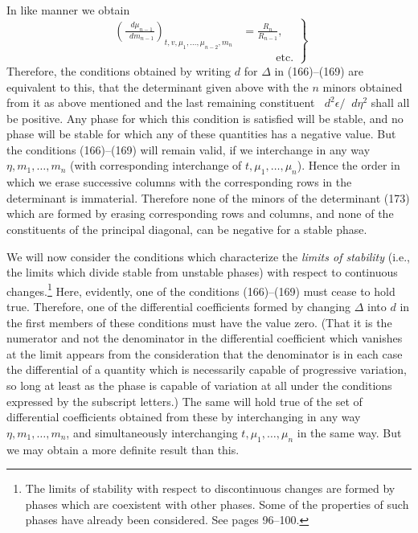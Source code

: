 \documentclass[11pt]{article}
\newcommand{\dd}{\mathop{}\!d}
\newcommand{\eps}{\epsilon}
\newcommand{\D}{\Delta}
\begin{document}
In like manner we obtain
\begin{equation}
\left.\begin{aligned}
\left(\frac{\dd\mu_{n-1}}{\dd m_{n-1}}\right)_{t,v,\mu_1,\ldots,\mu_{n-2},m_n}&=\frac{R_n}{R_{n-1}},\\
&\hspace{3em}\text{etc.}
\end{aligned}\right\}
\end{equation}
Therefore, the conditions obtained by writing $d$ for $\D$ in (166)--(169) are equivalent to this, that the determinant given above with the $n$ minors obtained from it as above mentioned and the last remaining constituent $\dd^2\eps/\dd\eta^2$ shall all be positive. Any phase for which this condition is satisfied will be stable, and no phase will be stable for which any of these quantities has a negative value. But the conditions (166)--(169) will remain valid, if we interchange in any way $\eta,m_1,\ldots,m_n$ (with corresponding interchange of $t,\mu_1,\ldots,\mu_n$). Hence the order in which we erase successive columns with the corresponding rows in the determinant is immaterial. Therefore none of the minors of the determinant (173) which are formed by erasing corresponding rows and columns, and none of the constituents of the principal diagonal, can be negative for a stable phase.

We will now consider the conditions which characterize the \textit{limits of stability} (i.e., the limits which divide stable from unstable phases) with respect to continuous changes.\footnote{The limits of stability with respect to discontinuous changes are formed by phases which are coexistent with other phases. Some of the properties of such phases have already been considered. See pages 96--100.} Here, evidently, one of the conditions (166)--(169) must cease to hold true. Therefore, one of the differential coefficients formed by changing $\D$ into $d$ in the first members of these conditions must have the value zero. (That it is the numerator and not the denominator in the differential coefficient which vanishes at the limit appears from the consideration that the denominator is in each case the differential of a quantity which is necessarily capable of progressive variation, so long at least as the phase is capable of variation at all under the conditions expressed by the subscript letters.) The same will hold true of the set of differential coefficients obtained from these by interchanging in any way $\eta,m_1,\ldots,m_n$, and simultaneously interchanging $t,\mu_1,\ldots,\mu_n$ in the same way. But we may obtain a more definite result than this.
\end{document}
